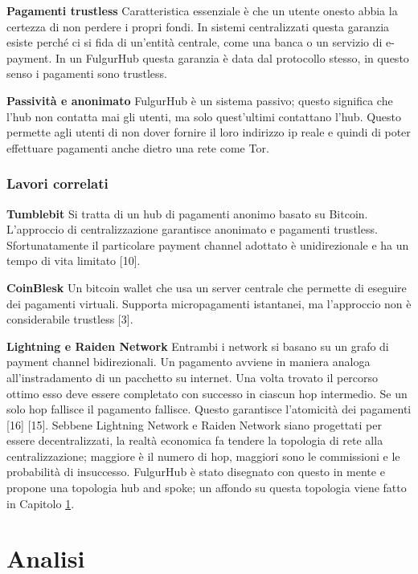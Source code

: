 \documentclass[12pt,italian,]{book}
\begin{document}
\textbf{\textbf{Pagamenti trustless}} Caratteristica essenziale è che un utente onesto abbia la certezza di non perdere i propri fondi. In sistemi centralizzati questa garanzia esiste perché ci si fida di un'entità centrale, come una banca o un servizio di e-payment. In un FulgurHub questa garanzia è data dal protocollo stesso, in questo senso i pagamenti sono trustless.

\textbf{\textbf{Passività e anonimato}} FulgurHub è un sistema passivo; questo significa che l'hub non contatta mai gli utenti, ma solo quest'ultimi contattano l'hub. Questo permette agli utenti di non dover fornire il loro indirizzo ip reale e quindi di poter effettuare pagamenti anche dietro una rete come Tor.

\hypertarget{lavori-correlati}{%
\subsection{Lavori correlati}\label{lavori-correlati}}

\textbf{\textbf{Tumblebit}} Si tratta di un hub di pagamenti anonimo basato su Bitcoin. L'approccio di centralizzazione garantisce anonimato e pagamenti trustless. Sfortunatamente il particolare payment channel adottato è unidirezionale e ha un tempo di vita limitato {[}10{]}.

\textbf{\textbf{CoinBlesk}} Un bitcoin wallet che usa un server centrale che permette di eseguire dei pagamenti virtuali. Supporta micropagamenti istantanei, ma l'approccio non è considerabile trustless {[}3{]}.

\textbf{\textbf{Lightning e Raiden Network}} Entrambi i network si basano su un grafo di payment channel bidirezionali. Un pagamento avviene in maniera analoga all'instradamento di un pacchetto su internet. Una volta trovato il percorso ottimo esso deve essere completato con successo in ciascun hop intermedio. Se un solo hop fallisce il pagamento fallisce. Questo garantisce l'atomicità dei pagamenti {[}16{]} {[}15{]}. Sebbene Lightning Network e Raiden Network siano progettati per essere decentralizzati, la realtà economica fa tendere la topologia di rete alla centralizzazione; maggiore è il numero di hop, maggiori sono le commissioni e le probabilità di insuccesso. FulgurHub è stato disegnato con questo in mente e propone una topologia hub and spoke; un affondo su questa topologia viene fatto in Capitolo \ref{analisi}.

\hypertarget{analisi}{%
\chapter{Analisi}\label{analisi}}
\end{document}
